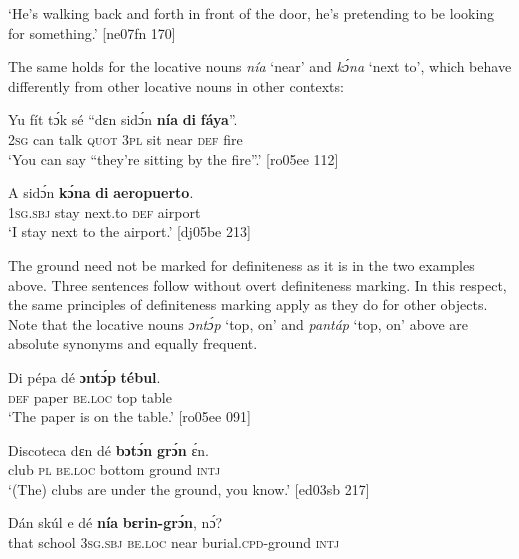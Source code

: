 \glt ‘He’s walking back and forth in front of the door, he’s pretending to be 
looking for something.’ [ne07fn 170]
\z

The same holds for the locative nouns \textit{nía} ‘near’ and \textit{kɔ́na} ‘next to’, which behave differently from other locative nouns in other contexts: 


\ea%
    \label{ex:key:923}
    \gll Yu  fít  tɔ́k  sé    “dɛn    sidɔ́n  \textbf{nía}    \textbf{di}  \textbf{fáya}”.\\
\textsc{2sg}  can  talk  \textsc{quot}    \textsc{3pl}    sit    near    \textsc{def}   fire\\

\glt ‘You can say “they’re sitting by the fire”.’ [ro05ee 112]
\z


\ea%
    \label{ex:key:924}
    \gll A    sidɔ́n  \textbf{kɔ́na}    \textbf{di}  \textbf{aeropuerto}.\\
\textsc{1sg.sbj}  stay    next.to    \textsc{def}  airport\\

\glt ‘I stay next to the airport.’ [dj05be 213]
\z

The ground need not be marked for definiteness as it is in the two examples above. Three sentences follow without overt definiteness marking. In this respect, the same principles of definiteness marking apply as they do for other objects. Note that the locative nouns \textit{ɔntɔ́p} ‘top, on’  and \textit{pantáp} ‘top, on’  above are absolute synonyms and equally frequent.


\ea%
    \label{ex:key:925}
    \gll Di  pépa  dé    \textbf{ɔntɔ́p}  \textbf{tébul}.\\
\textsc{def}  paper  \textsc{be.loc}  top    table\\

\glt ‘The paper is on the table.’ [ro05ee 091]
\z


\ea%
    \label{ex:key:926}
    \gll Discoteca  dɛn  dé    \textbf{bɔtɔ́n}  \textbf{grɔ́n}  ɛ́n.\\
club      \textsc{pl}  \textsc{be.loc}  bottom  ground  \textsc{intj}\\

\glt ‘(The) clubs are under the ground, you know.’ [ed03sb 217]
\z


\ea%
    \label{ex:key:927}
    \gll Dán  skúl    e    dé    \textbf{nía}    \textbf{bɛrin-grɔ́n},    nɔ́?\\
that  school  \textsc{3sg.sbj}  \textsc{be.loc}  near    burial.\textsc{cpd}{}-ground  \textsc{intj}\\

